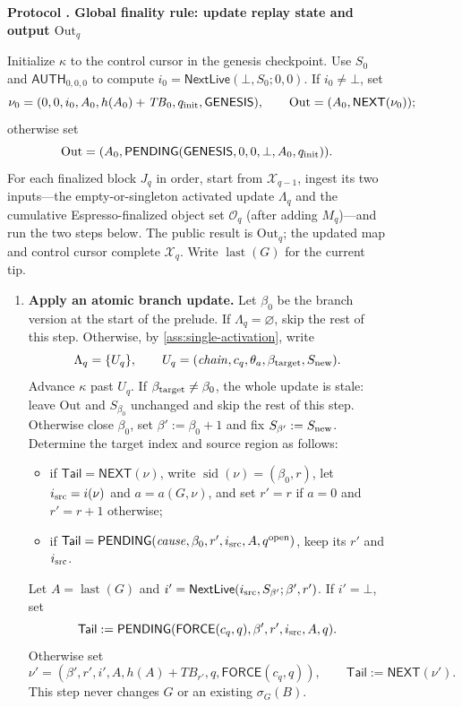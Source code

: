 \documentclass[11pt,a4paper]{article}
\newcommand{\TB}{\mathit{TB}}
\newcommand{\tagg}[1]{\ensuremath{\mathsf{#1}}}
\newcounter{protocol}
\newenvironment{protocol}[3][htbp]{\begin{figure}[#1]\refstepcounter{protocol}\label{#2}
\begin{mdframed}[linewidth=.6pt,skipabove=0pt,skipbelow=0pt,
innertopmargin=7pt,innerbottommargin=7pt]\small
\textbf{Protocol \theprotocol. #3}\par\smallskip}{\end{mdframed}\end{figure}}
\begin{document}
\begin{protocol}[H]{alg:global-rule}{Global finality rule: update replay state and output $\mathrm{Out}_q$}
Initialize $\kappa$ to the control cursor in the genesis checkpoint. Use
$S_0$ and $\tagg{AUTH}_{0,0,0}$ to compute
$i_0=\tagg{NextLive}(\bot,S_0;0,0)$.  If $i_0\ne\bot$, set
\[
 \nu_0=(0,0,i_0,A_0,h(A_0)+\TB_0,q_{\rm init},\tagg{GENESIS}),
 \qquad \mathrm{Out}=(A_0,\tagg{NEXT}(\nu_0));
\]
otherwise set
\[
 \mathrm{Out}=(A_0,
 \tagg{PENDING}(\tagg{GENESIS},0,0,\bot,A_0,q_{\rm init})).
\]
For each finalized block $J_q$ in order, start from $\mathcal X_{q-1}$,
ingest its two inputs---the empty-or-singleton activated update
$\Lambda_q$ and the cumulative
Espresso-finalized object set $\mathcal O_q$ (after adding $M_q$)---and
run the two steps below. The public result is $\mathrm{Out}_q$; the
updated map and control cursor complete $\mathcal X_q$. Write
$\operatorname{last}(G)$ for the current tip.
\begin{enumerate}[label=\textbf{\arabic*)},itemsep=3pt]
\item \textbf{Apply an atomic branch update.}
Let $\beta_0$ be the branch version at the start of the prelude. If
$\Lambda_q=\varnothing$, skip the rest of this step. Otherwise, by
\cref{ass:single-activation}, write
\[
 \Lambda_q=\{U_q\},\qquad
 U_q=(\mathit{chain},c_q,\theta_a,\beta_{\rm target},S_{\rm new}).
\]
Advance $\kappa$ past $U_q$. If $\beta_{\rm target}\ne\beta_0$, the
whole update is stale: leave $\mathrm{Out}$ and $S_{\beta_0}$ unchanged
and skip the rest of this step. Otherwise close $\beta_0$, set
$\beta':=\beta_0+1$ and fix $S_{\beta'}:=S_{\rm new}$. Determine the target
index and source region as follows:
  \begin{itemize}[itemsep=1pt]
  \item if $\mathsf{Tail}=\tagg{NEXT}(\nu)$, write
  $\operatorname{sid}(\nu)=(\beta_0,r)$, let $i_{\rm src}=i(\nu)$ and
  $a=a(G,\nu)$, and set $r'=r$ if $a=0$ and $r'=r+1$ otherwise;
  \item if $\mathsf{Tail}=\tagg{PENDING}
  (\mathit{cause},\beta_0,r',i_{\rm src},A,q^{\rm open})$, keep its $r'$ and
  $i_{\rm src}$.
  \end{itemize}
Let $A=\operatorname{last}(G)$ and
$i'=\tagg{NextLive}(i_{\rm src},S_{\beta'};\beta',r')$.  If $i'=\bot$, set
\[
 \mathsf{Tail}:=\tagg{PENDING}
 (\tagg{FORCE}(c_q,q),\beta',r',i_{\rm src},A,q).
\]
Otherwise set
\[
 \nu'=(\beta',r',i',A,h(A)+\TB_{r'},q,
       \tagg{FORCE}(c_q,q)),
 \qquad \mathsf{Tail}:=\tagg{NEXT}(\nu').
\]
This step never changes $G$ or an existing $\sigma_G(B)$.


\end{enumerate}
\end{protocol}
\end{document}
